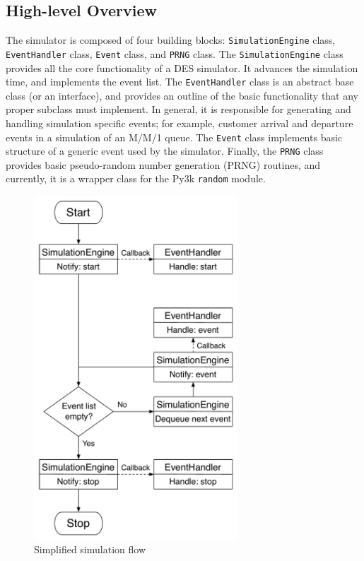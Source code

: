 \subsection{High-level Overview}
\label{sub:high_level_overview_simappendix}
The simulator is composed of four building blocks: \lstinline{SimulationEngine} class, \lstinline{EventHandler} class, \lstinline{Event} class, and \lstinline{PRNG} class. The \lstinline{SimulationEngine} class provides all the core functionality of a DES simulator. It advances the simulation time, and implements the event list. The \lstinline{EventHandler} class is an abstract base class (or an interface), and provides an outline of the basic functionality that any proper subclass must implement. In general, it is responsible for generating and handling simulation specific events; for example, customer arrival and departure events in a simulation of an M/M/1 queue. The \lstinline{Event} class implements basic structure of a generic event used by the simulator. Finally, the \lstinline{PRNG} class provides basic pseudo-random number generation (PRNG) routines, and currently, it is a wrapper class for the Py3k \lstinline{random} module.

\begin{figure}[p]
  \includegraphics[width=3in]{Appendices/Figures/simulation_flow}
  \caption{Simplified simulation flow}
  \label{fig:simulation_flow_simappendix}
\end{figure}

